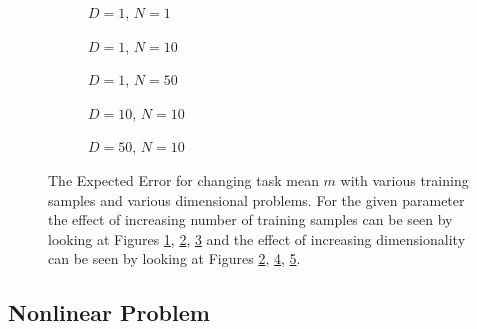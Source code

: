 \begin{figure}[!h]
  \centering
    \begin{subfigure}{0.3\textwidth}
      \centering
      \caption{$D=1$, $N=1$}
      \label{fig:linear-m-N-1-D-1}
    \end{subfigure}
    \begin{subfigure}{0.3\textwidth}
      \centering
      \caption{$D=1$, $N=10$}
      \label{fig:linear-m-N-10-D-1}
    \end{subfigure}
    \begin{subfigure}{0.3\textwidth}
      \centering
      \caption{$D=1$, $N=50$}
      \label{fig:linear-m-N-50-D-1}
    \end{subfigure}

    \begin{subfigure}{0.3\textwidth}
      \centering
      \caption{$D=10$, $N=10$}
      \label{fig:linear-m-N-10-D-10}
    \end{subfigure}
    \begin{subfigure}{0.3\textwidth}
      \centering
      \caption{$D=50$, $N=10$}
      \label{fig:linear-m-N-10-D-50}
    \end{subfigure}  

  \caption{The Expected Error for changing task mean $m$ with various training samples and various dimensional problems. For the given parameter the effect of increasing number of training samples can be seen by looking at Figures \ref{fig:linear-m-N-1-D-1}, \ref{fig:linear-m-N-10-D-1}, \ref{fig:linear-m-N-50-D-1} and the effect of increasing dimensionality can be seen by looking at Figures \ref{fig:linear-m-N-10-D-1}, \ref{fig:linear-m-N-10-D-10}, \ref{fig:linear-m-N-10-D-50}.}\label{fig:linear-m}
\end{figure}

\subsection{Nonlinear Problem}

